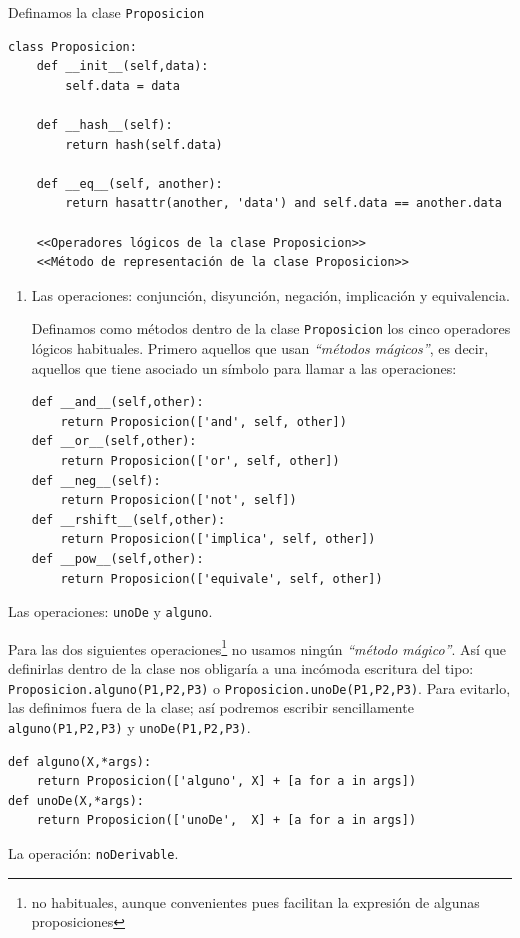 \documentclass[10pt,a4paper]{report}
\begin{document}
Definamos la clase \texttt{Proposicion}
\begin{verbatim}
class Proposicion:
    def __init__(self,data):
        self.data = data

    def __hash__(self):
        return hash(self.data)

    def __eq__(self, another):
        return hasattr(another, 'data') and self.data == another.data

    <<Operadores lógicos de la clase Proposicion>>
    <<Método de representación de la clase Proposicion>>
\end{verbatim}
\begin{enumerate}
\item Las operaciones: conjunción, disyunción, negación, implicación y equivalencia.
\label{sec:org0b17f94}

Definamos como métodos dentro de la clase \texttt{Proposicion} los cinco operadores lógicos habituales.
Primero aquellos que usan \emph{``métodos mágicos''}, es decir, aquellos que tiene asociado un símbolo para llamar a las operaciones:
\begin{verbatim}
def __and__(self,other):
    return Proposicion(['and', self, other])
def __or__(self,other):
    return Proposicion(['or', self, other])
def __neg__(self):
    return Proposicion(['not', self])
def __rshift__(self,other):
    return Proposicion(['implica', self, other])
def __pow__(self,other):
    return Proposicion(['equivale', self, other])

\end{verbatim}
\end{enumerate}
\item Las operaciones: \texttt{unoDe} y \texttt{alguno}.
\label{sec:orgf26e2ea}

Para las dos siguientes operaciones\footnote{no habituales, aunque convenientes pues facilitan la expresión de algunas proposiciones} no usamos ningún \emph{``método mágico''}.
Así que definirlas dentro de la clase nos obligaría a una incómoda escritura del tipo: \texttt{Proposicion.alguno(P1,P2,P3)} o \texttt{Proposicion.unoDe(P1,P2,P3)}.
Para evitarlo, las definimos fuera de la clase; así podremos escribir sencillamente \texttt{alguno(P1,P2,P3)} y \texttt{unoDe(P1,P2,P3)}.
\begin{verbatim}
def alguno(X,*args):
    return Proposicion(['alguno', X] + [a for a in args])
def unoDe(X,*args):
    return Proposicion(['unoDe',  X] + [a for a in args])

\end{verbatim}
\item La operación: \texttt{noDerivable}.
\label{sec:org939fa92}
\end{document}
